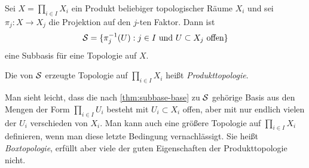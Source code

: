 Sei $X = \prod_{i\in I} X_i$ ein Produkt beliebiger topologischer Räume $X_i$
und sei $\pi_j\colon X\to X_j$ die Projektion auf den $j$-ten Faktor. Dann ist
\[
\cal S = \{ \pi_j^{-1}(U) : \textnormal{$j\in I$ und $U\subset X_j$ offen} \}
\]
eine Subbasis für eine Topologie auf $X$.
\begin{definition}
Die von $\cal S$ erzeugte Topologie auf $\prod_{i\in I} X_i$ heißt
\emph{Produkttopologie}.
\end{definition}
Man sieht leicht, dass die nach \autoref{thm:subbase-base} zu $\cal S$ gehörige
Basis aus den Mengen der Form $\prod_{i\in I} U_i$ besteht mit $U_i\subset X_i$ offen,
aber mit nur endlich vielen der $U_i$ verschieden von $X_i$. Man kann auch eine
größere Topologie auf $\prod_{i\in I} X_i$ definieren, wenn man diese letzte
Bedingung vernachlässigt. Sie heißt \emph{Boxtopologie}, erfüllt aber viele der
guten Eigenschaften der Produkttopologie nicht.


